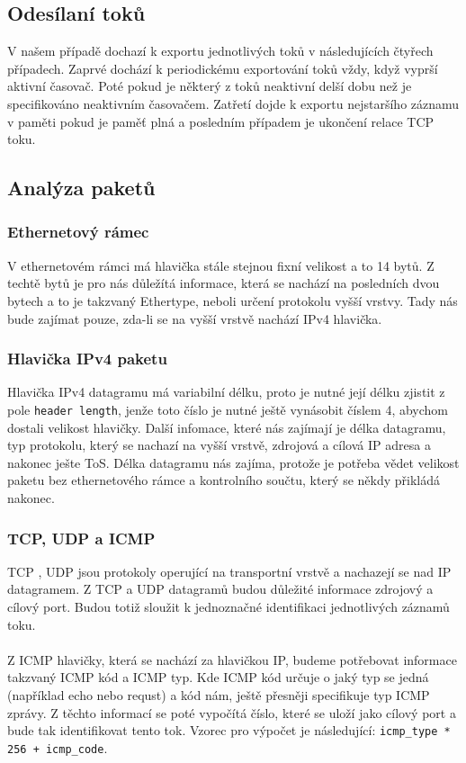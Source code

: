 \documentclass[12pt]{article}
\begin{document}
\subsection{Odesílaní toků}
V našem případě dochazí k exportu jednotlivých toků v následujících čtyřech případech. Zaprvé dochází k periodickému exportování toků vždy, když vyprší aktivní časovač. Poté pokud je některý z toků neaktivní delší dobu
než je specifikováno neaktivním časovačem. Zatřetí dojde k exportu nejstaršího záznamu v paměti pokud je paměť plná a posledním případem je ukončení relace TCP toku.
\pagebreak
\subsection{Analýza paketů}

\subsubsection{Ethernetový rámec}
V ethernetovém rámci má hlavička stále stejnou fixní velikost a to 14 bytů. Z techtě bytů je pro nás důležítá informace, která se nachází na posledních dvou bytech
a to je takzvaný Ethertype, neboli určení protokolu vyšší vrstvy. Tady nás bude zajímat pouze, zda-li se na vyšší vrstvě nachází IPv4 hlavička.

\subsubsection{Hlavička IPv4 paketu}
Hlavička IPv4 datagramu \cite{IPV4ICMP} má variabilní délku, proto je nutné její délku zjistit z pole \texttt{header length}, jenže toto číslo je nutné ještě vynásobit číslem 4, abychom dostali velikost hlavičky.
Další infomace, které nás zajímají je délka datagramu, typ protokolu, který se nachazí na vyšší vrstvě, zdrojová a cílová IP adresa a nakonec ješte ToS. 
Délka datagramu nás zajíma, protože je potřeba vědet velikost paketu bez ethernetového rámce a kontrolního součtu, který se někdy přikládá nakonec.

\subsubsection{TCP, UDP a ICMP}
TCP \cite{TCP}, UDP \cite{UDP} jsou protokoly operující na transportní vrstvě a nachazejí se nad IP datagramem. Z TCP a UDP datagramů budou důležité informace zdrojový a cílový port. Budou totiž sloužit k jednoznačné identifikaci jednotlivých záznamů toku.
\\\\
Z ICMP \cite{IPV4ICMP} hlavičky, která se nachází za hlavičkou IP, budeme potřebovat informace takzvaný ICMP kód a ICMP typ. Kde ICMP kód určuje o jaký typ se jedná (například echo nebo requst) a kód nám, ještě přesněji specifikuje typ ICMP zprávy.
Z těchto informací se poté vypočítá číslo, které se uloží jako cílový port a bude tak identifikovat tento tok. Vzorec pro výpočet je následující: \texttt{icmp\_type * 256 + icmp\_code}.
\end{document}
